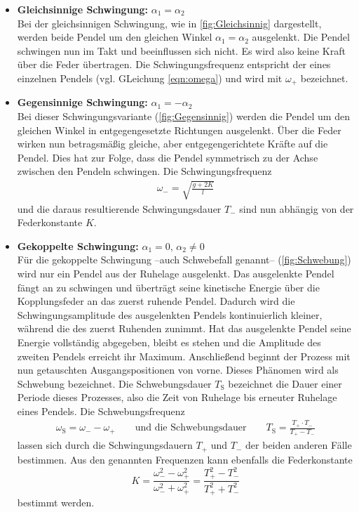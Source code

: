 \begin{itemize}
    \item \textbf{Gleichsinnige Schwingung:} $\alpha_1 = \alpha_2$ \\
    Bei der gleichsinnigen Schwingung, wie in \autoref{fig:Gleichsinnig} dargestellt, werden beide Pendel um den gleichen Winkel $\alpha_1 = \alpha_2$ ausgelenkt. Die Pendel schwingen nun im Takt und beeinflussen sich nicht.
    Es wird also keine Kraft über die Feder übertragen. Die Schwingungsfrequenz entspricht der eines einzelnen Pendels (vgl. GLeichung \eqref{eqn:omega}) und wird mit $\omega_+$ bezeichnet.

    \item \textbf{Gegensinnige Schwingung:} $\alpha_1 = -\alpha_2$ \\
    Bei dieser Schwingungsvariante (\autoref{fig:Gegensinnig}) werden die Pendel um den gleichen Winkel in entgegengesetzte Richtungen ausgelenkt. Über die Feder wirken nun betragsmäßig gleiche,
    aber entgegengerichtete Kräfte auf die Pendel. Dies hat zur Folge, dass die Pendel symmetrisch zu der Achse zwischen den Pendeln schwingen. Die Schwingungsfrequenz 
    \begin{gather}
        \label{eqn:omega_Gegensinnig}
        \omega_- = \sqrt{\frac{g + 2K}{l}}
    \end{gather}
    und die daraus resultierende Schwingungsdauer $T_-$ sind nun abhängig von der Federkonstante $K$. 
    
    \item \textbf{Gekoppelte Schwingung:} $\alpha_1 = 0, \, \alpha_2 \neq 0$ \\
    Für die gekoppelte Schwingung --auch Schwebefall genannt-- (\autoref{fig:Schwebung}) wird nur ein Pendel aus der Ruhelage ausgelenkt. Das ausgelenkte Pendel fängt an zu schwingen und überträgt seine 
    kinetische Energie über die Kopplungsfeder an das zuerst ruhende Pendel. Dadurch wird die Schwingungsamplitude des ausgelenkten Pendels kontinuierlich kleiner, während
    die des zuerst Ruhenden zunimmt. Hat das ausgelenkte Pendel seine Energie vollständig abgegeben, bleibt es stehen und die Amplitude des zweiten Pendels erreicht ihr Maximum.
    Anschließend beginnt der Prozess mit nun getauschten Ausgangspositionen von vorne. Dieses Phänomen wird als Schwebung bezeichnet. Die Schwebungsdauer $T_{\text{S}}$ bezeichnet 
    die Dauer einer Periode dieses Prozesses, also die Zeit von Ruhelage bis erneuter Ruhelage eines Pendels. Die Schwebungsfrequenz
    \begin{gather}
        \label{eqn:Schwebung}
        \omega_{\text{S}} = \omega_- - \omega_+ \qquad \text{und die Schwebungsdauer} \qquad T_{\text{S}}  = \frac{T_+ \cdot T_-}{T_+ - T_-}
    \end{gather}
    lassen sich durch die Schwingungsdauern $T_+$ und $T_-$ der beiden anderen Fälle bestimmen.
    Aus den genannten Frequenzen kann ebenfalls die Federkonstante
    \begin{equation}
        \label{eqn:Federkonstante}
        K = \frac{\omega_-^2 - \omega_+^2}{\omega_-^2 + \omega_+^2} = \frac{T_+^2 - T_-^2}{T_+^2 + T_-^2}
    \end{equation}
    bestimmt werden.
\end{itemize}

